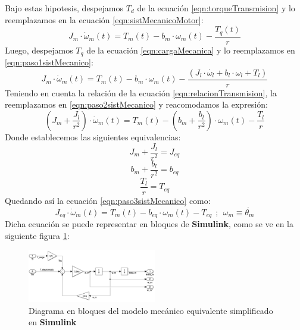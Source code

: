 \documentclass[10pt]{article}
\begin{document}
\begin{itemize}
	Bajo estas hipotesis, despejamos $T_{d}$ de la ecuación \ref{eqn:torqueTransmision} y lo reemplazamos en la ecuación \ref{eqn:sistMecanicoMotor}:
	\begin{equation}
		\label{eqn:paso1sistMecanico}
		J_{m}\cdot \dot{\omega }_{m}\left ( t \right )=T_{m}\left ( t \right )-b_{m}\cdot \omega_{m}\left ( t \right )-\frac{T_{q}\left ( t \right )}{r}
	\end{equation}
	Luego, despejamos $T_{q}$ de la ecuación \ref{eqn:cargaMecanica} y lo reemplazamos en \ref{eqn:paso1sistMecanico}:
	\begin{equation}
		\label{eqn:paso2sistMecanico}
		J_{m}\cdot \dot{\omega }_{m}\left ( t \right )=T_{m}\left ( t \right )-b_{m}\cdot \omega_{m}\left ( t \right )-\frac{\left ( J_{l}\cdot \dot{\omega_{l}}+b_{l}\cdot \omega_{l}+T_{l} \right )}{r}
	\end{equation}
	Teniendo en cuenta la relación de la ecuación \ref{eqn:relacionTransmision}, la reemplazamos en \ref{eqn:paso2sistMecanico} y reacomodamos la expresión:
	\begin{equation}
		\label{eqn:paso3sistMecanico}
		\left ( J_{m}+\frac{J_{l}}{r^{2}} \right )\cdot \dot{\omega }_{m}\left ( t \right )=T_{m}\left ( t \right )-\left ( b_{m}+\frac{b_{l}}{r^{2}} \right )\cdot \omega_{m}\left ( t \right )-\frac{T_{l}}{r}
	\end{equation}
	Donde establecemos las siguientes equivalencias:
	\begin{equation}
		J_{m}+\frac{J_{l}}{r^{2}}=J_{eq}
	\end{equation}
	\begin{equation}
		b_{m}+\frac{b_{l}}{r^{2}}=b_{eq}
	\end{equation}
	\begin{equation}
		\frac{T_{l}}{r}=T_{eq}
	\end{equation}
	Quedando así la ecuación \ref{eqn:paso3sistMecanico} como:
	\begin{equation}
		J_{eq}\cdot \dot{\omega }_{m}\left ( t \right )=T_{m}\left ( t \right )-b_{eq}\cdot \omega_{m}\left ( t \right )-T_{eq} \ \ ;\ \ \omega_{m} \equiv \dot{\theta_{m}}
	\end{equation}
	Dicha ecuación se puede representar en bloques de \textbf{Simulink}, como se ve en la siguiente figura \ref{fig:MecanicoEquivalente}:
	\begin{figure}[h!]
		\centering
		\includegraphics[width=0.5\textwidth]{2_1_1_ModeloMecanicoEquivalente.png}
		\caption{\label{fig:MecanicoEquivalente} Diagrama en bloques del modelo mecánico equivalente simplificado en \textbf{Simulink}}
	\end{figure}

\end{itemize}
\end{document}
